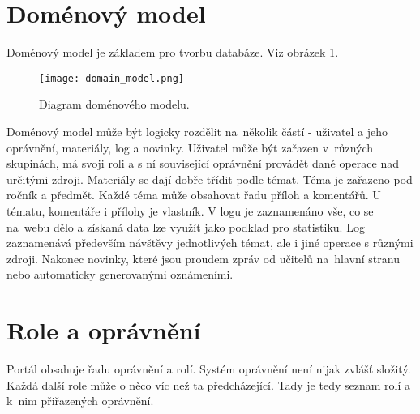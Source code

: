 \documentclass[thesis=B,czech]{FITthesis}[2012/06/26]
\begin{document}
\section{Doménový model}

Doménový model je základem pro tvorbu databáze. Viz obrázek \ref{fig:domainmodel}.

\begin{figure}
  \centering
	\texttt{[image: domain\_model.png]}
	\caption{Diagram doménového modelu.} \label{fig:domainmodel} 
\end{figure}

\begin{center}
\end{center}

Doménový model může být logicky rozdělit na~několik částí - uživatel a jeho oprávnění, materiály, log a novinky. Uživatel může být zařazen v~různých skupinách, má svoji roli a s ní související oprávnění provádět dané operace nad určitými zdroji. Materiály se dají dobře třídit podle témat. Téma je zařazeno pod ročník a předmět. Každé téma může obsahovat řadu příloh a komentářů. U tématu, komentáře i přílohy je vlastník. V logu je zaznamenáno vše, co se na~webu dělo a získaná data lze využít jako podklad pro statistiku. Log zaznamenává především návštěvy jednotlivých témat, ale i jiné operace s různými zdroji. Nakonec novinky, které jsou proudem zpráv od učitelů na~hlavní stranu nebo automaticky generovanými oznámeními.

\section{Role a oprávnění}

Portál obsahuje řadu oprávnění a rolí. Systém oprávnění není nijak zvlášť složitý. Každá další role může o něco víc než ta předcházející. Tady je tedy seznam rolí a k~nim přiřazených oprávnění.
\end{document}
